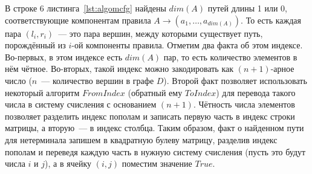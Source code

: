 \begin{algorithm}[H]
    \footnotesize
%
%
%
%
%
%
%
\end{algorithm}

В строке 6 листинга~\ref{lst:algomcfg} найдены $dim(A)$ путей длины 1 или 0, соответствующие компонентам правила $A \rightarrow (a_1, \dots, a_{dim(A)})$. То есть каждая пара $(l_i, r_i)$~--- это пара вершин, между которыми существует путь, порождённый из $i$-ой компоненты правила. Отметим два факта об этом индексе. Во-первых, в этом индексе есть $dim(A)$ пар, то есть количество элементов в нём чётное. Во-вторых, такой индекс можно закодировать как $(n+1)$-арное число ($n$~--- количество вершин в графе $D$). Второй факт позволяет использовать некоторый алгоритм $FromIndex$ (обратный ему $ToIndex$) для перевода такого числа в систему счисления с основанием $(n+1)$. Чётность числа элементов позволяет разделить индекс пополам и записать первую часть в индекс строки матрицы, а вторую~--- в индекс столбца. Таким образом, факт о найденном пути для нетерминала запишем в квадратную булеву матрицу, разделив индекс пополам и переведя каждую часть в нужную систему счисления (пусть это будут числа $i$ и $j$), а в ячейку $(i, j)$ поместим значение $True$.


